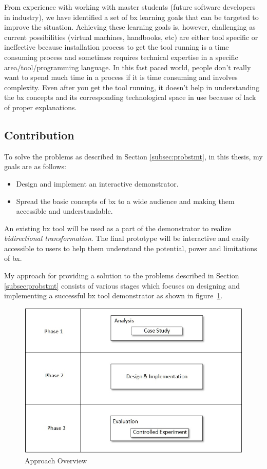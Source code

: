 From experience with working with master students (future software developers in industry), we have identified a set of bx learning goals that can be targeted to improve the situation.
Achieving these learning goals is, however, challenging as current possibilities (virtual machines, handbooks, etc) are either tool specific or ineffective because installation process to get the tool running is a time consuming process and sometimes requires technical expertise in a specific area/tool/programming language. In this fast paced world, people don't really want to spend much time in a process if it is time consuming and involves complexity. Even after you get the tool running, it doesn't help in understanding the bx concepts and its corresponding technological space in use because of lack of proper explanations.

\subsection{Contribution}\label{subsec:contribution}
To solve the problems as described in Section \ref{subsec:probstmt}, in this thesis, my goals are as follows:
\begin{itemize} 
\item {Design and implement an interactive demonstrator.} 
\item {Spread the basic concepts of bx to a wide audience and making them accessible and understandable.}
\end{itemize}

An existing bx tool will be used as a part of the demonstrator to realize \textit{bidirectional transformation}. The final prototype will be interactive and easily accessible to users to help them understand the potential, power and limitations of bx.

My approach for providing a solution to the problems described in Section \ref{subsec:probstmt}  consists of various stages which focuses on designing and implementing a successful bx tool demonstrator as shown in figure~\ref{fig:Approach_Overview}. 

\begin{figure}
	\includegraphics[width=1\textwidth]{figures/Approach_Overview}
	\caption{Approach Overview}
	\label{fig:Approach_Overview}
\end{figure}

